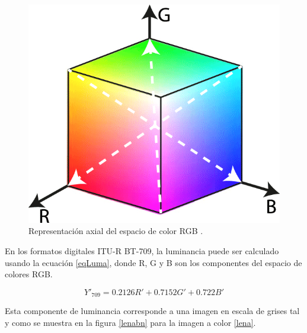 \documentclass[twoside,spanish,ESP,MSc]{plantillaLabUPV}
\theoremstyle{definition}
\begin{document}
\begin{figure}[!tbh] 
	\centering 
		\includegraphics[scale=.35]{ima/rgbcol} 
	\caption{Representación axial del espacio de color RGB \cite{rgbspace}.} 
	\label{rgbcol} 
\end{figure}

En los formatos digitales ITU-R BT-709, la luminancia puede ser calculado usando la ecuación \ref{eqLuma}, donde R, G y B son los componentes del espacio de colores RGB.

\begin{equation}\label{eqLuma}
{\displaystyle Y'_{\text{709}}=0.2126R'+0.7152G'+0.722B'}
\end{equation}

Esta componente de luminancia corresponde a una imagen en escala de grises tal y como se muestra en la figura \ref{lenabn} para la imagen a color \ref{lena}.
\end{document}
